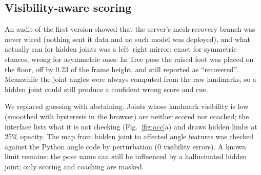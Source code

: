 \subsection{Visibility-aware scoring}
An audit of the first version showed that the server's mesh-recovery branch was never wired (nothing sent it data and no such model was deployed), and what actually ran for hidden joints was a left--right mirror: exact for symmetric stances, wrong for asymmetric ones. In Tree pose the raised foot was placed on the floor, off by 0.23 of the frame height, and still reported as ``recovered''. Meanwhile the joint angles were always computed from the raw landmarks, so a hidden joint could still produce a confident wrong score and cue.

We replaced guessing with abstaining. Joints whose landmark visibility is low (smoothed with hysteresis in the browser) are neither scored nor coached; the interface lists what it is not checking (Fig.~\ref{fig:occ}a) and draws hidden limbs at 25\% opacity. The map from hidden joint to affected angle features was checked against the Python angle code by perturbation (0 visibility errors). A known limit remains: the pose name can still be influenced by a hallucinated hidden joint; only scoring and coaching are masked.

